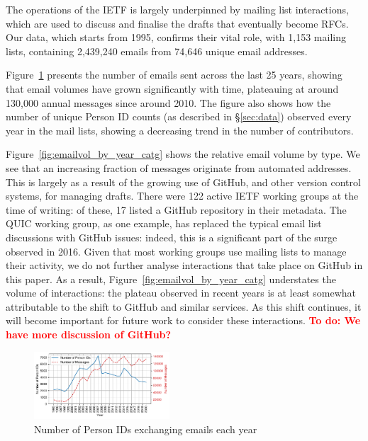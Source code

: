 \documentclass[twocolumn,10pt]{article}
\newcommand{\todo}[1]{\textbf{\textcolor{red}{To do: #1}}}
\newcommand{\pb}[1]{\vspace{0.75ex}\noindent{\textbf{#1}}}
\begin{document}

The operations of the IETF is largely underpinned by mailing list
interactions, which are used to discuss and finalise the drafts that
eventually become RFCs. Our data, which starts from 1995, confirms their
vital role, with 1,153 mailing lists, containing 2,439,240 emails from
74,646 unique email addresses.

\pb{Volume of Discussion:}
Figure~\ref{fig:pid_count_emailing_yearly} presents the number of emails
sent across the last 25 years, showing that email volumes have grown
significantly with time, plateauing at around 130,000 annual messages since
around 2010. The figure also shows how the number of unique Person ID
counts (as described in \S\ref{sec:data}) observed every year in the mail
lists, showing a decreasing trend in the number of contributors.

Figure~\ref{fig:emailvol_by_year_catg} shows the relative email volume by
type. We see that an increasing fraction of messages originate from
automated addresses. This is largely as a result of the growing use of
GitHub, and other version control systems, for managing drafts. There were
122 active IETF working groups at the time of writing: of these, 17 listed
a GitHub repository in their metadata. The QUIC working group, as one
example, has replaced the typical email list discussions with GitHub
issues: indeed, this is a significant part of the surge observed in 2016.
Given that most working groups use mailing lists to manage their activity,
we do not further analyse interactions that take place on GitHub in this
paper. As a result, Figure~\ref{fig:emailvol_by_year_catg} understates the
volume of interactions: the plateau observed in recent years is at least
somewhat attributable to the shift to GitHub and similar services. As this
shift continues, it will become important for future work to consider these
interactions.
\todo{We have more discussion of GitHub?}


\begin{figure}
\includegraphics[width=0.45\textwidth]{figures-prev/imc-2021/emails/pid_count_emailing_yearly.pdf}
\caption{Number of Person IDs exchanging emails each year}
\label{fig:pid_count_emailing_yearly}
\end{figure}
\end{document}
